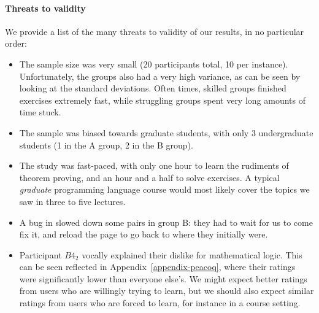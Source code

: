 \paragraph{Threats to validity}

We provide a list of the many threats to validity of our results, in no
particular order:

\begin{itemize}

  \item The sample size was very small (20 participants total, 10 per instance).
Unfortunately, the groups also had a very high variance, as can be seen by
looking at the standard deviations.  Often times, skilled groups finished
exercises extremely fast, while struggling groups spent very long amounts of
time stuck.

  \item The sample was biased towards graduate students, with only 3
undergraduate students (1 in the A group, 2 in the B group).

  \item The study was fast-paced, with only one hour to learn the rudiments of
theorem proving, and an hour and a half to solve exercises.  A typical
\emph{graduate} programming language course would most likely cover the topics
we saw in three to five lectures.

  \item A bug in \PeaCoq{} slowed down some pairs in group B: they had to wait
for us to come fix it, and reload the page to go back to where they initially
were.

  \item Participant $B4_{2}$ vocally explained their dislike for mathematical
logic.  This can be seen reflected in Appendix~\ref{appendix-peacoq}, where
their ratings were significantly lower than everyone else's.  We might expect better ratings from users who are willingly trying to learn, but we should also expect similar ratings from users who are forced to learn, for instance in a course setting.

\end{itemize}
